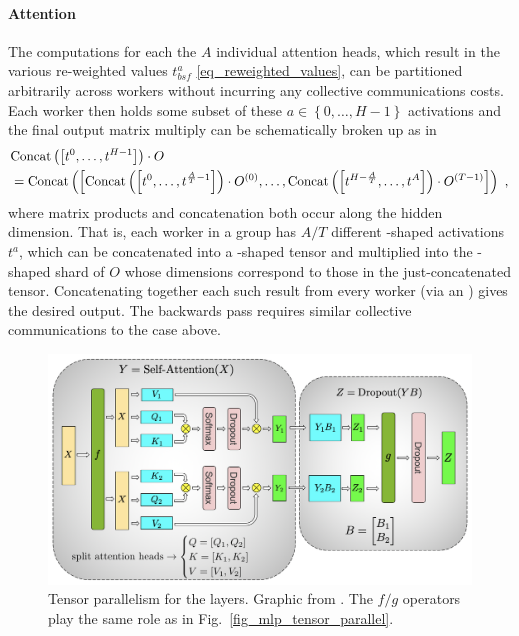 \documentclass[11pt]{article}
\begin{document}
 \paragraph{Attention} The computations for each the $ A $ individual attention heads, which result
 in the various re-weighted values $ t ^{ a }_{ bsf } $ \eqref{eq_reweighted_values}, can be
 partitioned arbitrarily across workers without incurring any collective communications costs.  Each
 worker then holds some subset of these $ a \in \left \{ 0, \ldots , H-1 \right \} $ activations and
 the final output matrix multiply can be schematically broken up as in \begin{align} &{\rm Concat}
     \left ( \left [ t ^{ 0 }, \ldots , t ^{ H-1 } \right ] \right ) \cdot O \nonumber\\ &= {\rm Concat}
     \left ( \left [ {\rm Concat}\left ( \left [ t ^{ 0 }, \ldots , t ^{ \frac{ A }{ T }-1 } \right
     ] \right ) \cdot O ^{ (0) }, \ldots ,{\rm Concat}\left ( \left [ t ^{ H-\frac{ A }{ T } },
\ldots , t ^{ A} \right ] \right ) \cdot O ^{ (T-1) } \right ] \right ) \ , \end{align} where matrix
products and concatenation both occur along the hidden dimension. That is, each worker in a group
has $ A/T $ different -shaped activations $ t ^{ a } $, which can be
concatenated into a -shaped tensor and multiplied into the
-shaped shard of $ O $ whose dimensions correspond to those in the just-concatenated tensor.
Concatenating together each such result from every worker (via an ) gives the
desired output. The backwards pass requires similar collective communications to the 
case above.


 \begin{figure}[ht]
     \centering
     \includegraphics[scale=.45]{figures/attention_mp_2.png}
     \caption{Tensor parallelism for the  layers. Graphic from
     \cite{shoeybi2020megatronlm}. The $ f/g $ operators play the same role as in
 Fig.~\ref{fig_mlp_tensor_parallel}.}
     \label{fig_attn_tensor_parallel}
 \end{figure}
\end{document}
